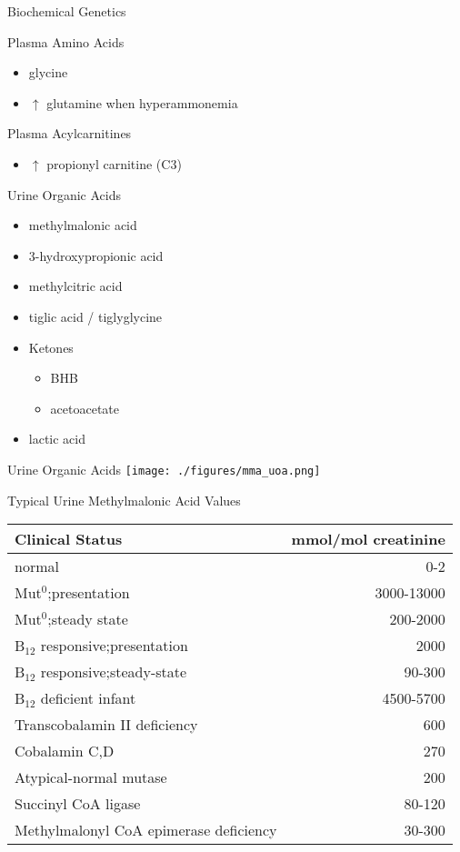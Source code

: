 \documentclass[presentation, smaller]{beamer}
\begin{document}
\begin{frame}[label={sec:orgheadline15}]{Biochemical Genetics}
\begin{block}{Plasma Amino Acids}
\begin{itemize}
\item \textpm{} glycine
\item \(\uparrow\) glutamine when hyperammonemia
\end{itemize}
\end{block}
\begin{block}{Plasma Acylcarnitines}
\begin{itemize}
\item \(\uparrow\) propionyl carnitine (C3)
\end{itemize}
\end{block}
\begin{block}{Urine Organic Acids}
\begin{itemize}
\item methylmalonic acid
\item 3-hydroxypropionic acid
\item methylcitric acid
\item tiglic acid / tiglyglycine
\item Ketones
\begin{itemize}
\item BHB
\item acetoacetate
\end{itemize}
\item lactic acid
\end{itemize}
\end{block}
\end{frame}

\begin{frame}[label={sec:orgheadline16}]{Urine Organic Acids}
\texttt{[image: ./figures/mma\_uoa.png]}
\end{frame}

\begin{frame}[label={sec:orgheadline17}]{Typical Urine Methylmalonic Acid Values}
\begin{center}
\begin{tabular}{lr}
Clinical Status & mmol/mol creatinine\\
\hline
normal & 0-2\\
Mut\(^{\text{0}}\);presentation & 3000-13000\\
Mut\(^{\text{0}}\);steady state & 200-2000\\
B\(_{\text{12}}\) responsive;presentation & 2000\\
B\(_{\text{12}}\) responsive;steady-state & 90-300\\
B\(_{\text{12}}\) deficient infant & 4500-5700\\
Transcobalamin II deficiency & 600\\
Cobalamin C,D & 270\\
Atypical-normal mutase & 200\\
Succinyl CoA ligase & 80-120\\
Methylmalonyl CoA epimerase deficiency & 30-300\\
\end{tabular}
\end{center}
\end{frame}
\end{document}

